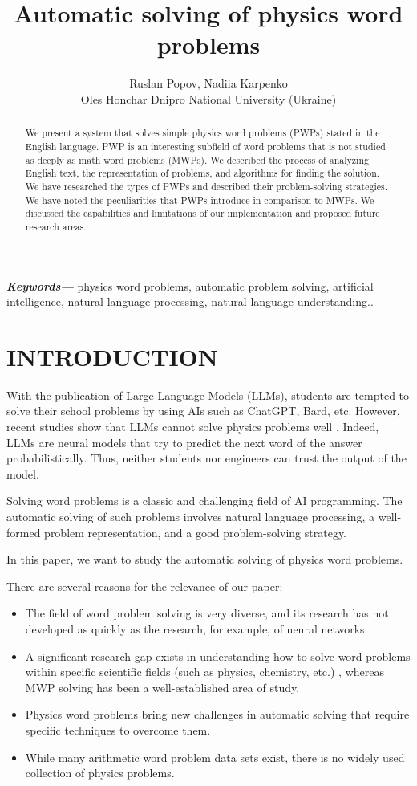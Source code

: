 \documentclass[a4paper, 12pt]{article}
\title{Automatic solving of physics word problems}
\author{Ruslan Popov, Nadiia Karpenko \\
	\small Oles Honchar Dnipro National University (Ukraine)}
\date{}
\providecommand{\keywords}[1]
{
	\small	
	\textbf{\textit{Keywords---}} #1.
}
\begin{document}
	\maketitle
	
	\begin{abstract}
		We present a system that solves simple physics
		word problems (PWPs) stated in the English language. PWP is an
		interesting subfield of word problems that is not studied as deeply as
		math word problems (MWPs). We described the process of analyzing English
		text, the representation of problems, and algorithms for finding the
		solution. We have researched the types of PWPs and described their
		problem-solving strategies. We have noted the peculiarities that PWPs
		introduce in comparison to MWPs. We discussed the capabilities and
		limitations of our implementation and proposed future research areas.
	\end{abstract}
	
	
	\keywords{physics word problems, automatic problem
	solving, artificial intelligence, natural language processing, natural
	language understanding.}
	
	\section{INTRODUCTION}
	
	With the publication of Large Language Models (LLMs), students are
	tempted to solve their school problems by using AIs such as ChatGPT,
	Bard, etc. However, recent studies show that LLMs cannot solve physics
	problems well \cite{frust_soc}. Indeed, LLMs are neural models that try to
	predict the next word of the answer probabilistically. Thus, neither
	students nor engineers can trust the output of the model.
	
	Solving word problems is a classic and challenging field of AI
	programming. The automatic solving of such problems involves natural
	language processing, a well-formed problem representation, and a good
	problem-solving strategy.
	
	In this paper, we want to study the automatic solving of physics word
	problems.
	
	There are several reasons for the relevance of our paper:
	
	\begin{itemize}
	\item
	  The field of word problem solving is very diverse, and its research
	  has not developed as quickly as the research, for example, of neural
	  networks.
	\item
	  A significant research gap exists in understanding how to solve word
	  problems within specific scientific fields (such as physics,
	  chemistry, etc.) , whereas MWP solving has been a well-established
	  area of study.
	\item
	  Physics word problems bring new challenges in automatic solving that
	  require specific techniques to overcome them.
	\item
	  While many arithmetic word problem data sets exist, there is no widely
	  used collection of physics problems.
	\end{itemize}
	
\end{document}
